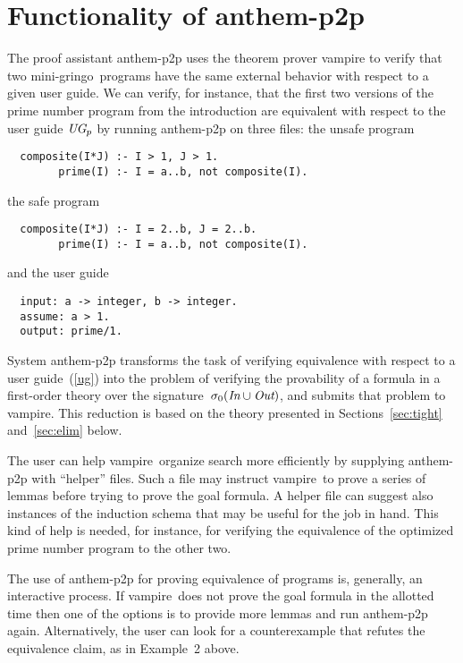 \documentclass{tlp}
\def\gringo{{\sc gringo}}
\def\vampire{{\sc vampire}}
\begin{document}
\section{Functionality of {\sc anthem-p2p}}

The proof assistant {\sc anthem-p2p} uses the theorem prover \hbox{\vampire}
to verify that two mini-\gringo\ programs have the
same external behavior with respect to a given user guide.
We can verify, for instance,
that the first two versions of the prime number program
from the introduction are equivalent with respect to the user guide
$\emph{UG}_p$ by running {\sc anthem-p2p} on three files: the
unsafe program
\begin{verbatim}
  composite(I*J) :- I > 1, J > 1.
        prime(I) :- I = a..b, not composite(I).
\end{verbatim}
the safe program
\begin{verbatim}
  composite(I*J) :- I = 2..b, J = 2..b.
        prime(I) :- I = a..b, not composite(I).
\end{verbatim}
and the user guide
\begin{verbatim}
  input: a -> integer, b -> integer.
  assume: a > 1.
  output: prime/1.
\end{verbatim}

System {\sc anthem-p2p} transforms the task of verifying equivalence
with respect to a user guide~(\ref{ug}) into the problem of verifying
the provability of a formula in a first-order theory over the
signature~$\sigma_0(\emph{In}\cup\emph{Out})$,
and submits that problem to \vampire.  This reduction is based on the theory
presented in Sections~\ref{sec:tight} and~\ref{sec:elim} below.

The user can help \vampire\ organize search more efficiently by
supplying {\sc anthem-p2p} with ``helper'' files.  Such a file may instruct
\vampire\ to prove a series of lemmas before trying to prove the goal formula.
A helper file can suggest also instances of the induction schema that may be
useful for the job in hand.  This kind of help is needed, for instance, for
verifying the equivalence of the optimized prime number program to the
other two.

The use of {\sc anthem-p2p} for proving
equivalence of programs is, generally, an interactive process.
If \vampire\ does not prove the goal formula in the allotted time then one of
the options is to provide more lemmas and run {\sc anthem-p2p}
again.  Alternatively, the user can look for a counterexample that refutes the
equivalence claim, as in Example~2 above.
\end{document}
